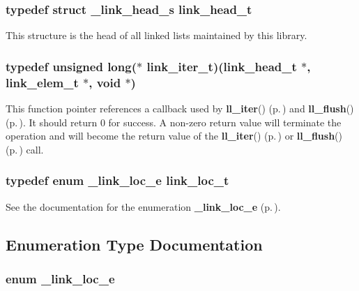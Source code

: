 \subsubsection{\setlength{\rightskip}{0pt plus 5cm}typedef struct \_\-link\_\-head\_\-s link\_\-head\_\-t}\label{group__dbprim__link_a0}




 This structure is the head of all linked lists maintained by this library. 
\subsubsection{\setlength{\rightskip}{0pt plus 5cm}typedef unsigned long($\ast$ link\_\-iter\_\-t)({\bf link\_\-head\_\-t} $\ast$, {\bf link\_\-elem\_\-t} $\ast$, void $\ast$)}\label{group__dbprim__link_a2}




 This function pointer references a callback used by {\bf ll\_\-iter}() {\rm (p.\,\pageref{group__dbprim__link_a10})} and {\bf ll\_\-flush}() {\rm (p.\,\pageref{group__dbprim__link_a11})}. It should return 0 for success. A non-zero return value will terminate the operation and will become the return value of the {\bf ll\_\-iter}() {\rm (p.\,\pageref{group__dbprim__link_a10})} or {\bf ll\_\-flush}() {\rm (p.\,\pageref{group__dbprim__link_a11})} call. 
\subsubsection{\setlength{\rightskip}{0pt plus 5cm}typedef enum {\bf \_\-link\_\-loc\_\-e} link\_\-loc\_\-t}\label{group__dbprim__link_a4}




 See the documentation for the enumeration {\bf \_\-link\_\-loc\_\-e} {\rm (p.\,\pageref{group__dbprim__link_a26})}. 

\subsection{Enumeration Type Documentation}
\subsubsection{\setlength{\rightskip}{0pt plus 5cm}enum \_\-link\_\-loc\_\-e}\label{group__dbprim__link_a26}




